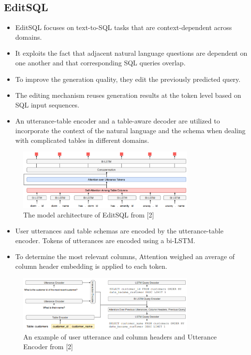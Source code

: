 \subsection*{EditSQL}

\begin{itemize}
    \item EditSQL focuses on text-to-SQL tasks that are context-dependent across domains.
    \item It exploits the fact that adjacent natural language questions are dependent on one another and that corresponding SQL queries overlap.
    \item To improve the generation quality, they edit the previously predicted query.
    \item The editing mechanism reuses generation results at the token level based on SQL input sequences.
    \item An utterance-table encoder and a table-aware decoder are utilized to incorporate the context of the natural language and the schema when dealing with complicated tables in different domains.
\end{itemize}

\begin{figure}[htb]
    \centering
    \includegraphics[width=0.8\textwidth]{pics/EditSQL/Table.png}
    \caption{The model architecture of EditSQL from [2]}
    \label{fig:EditSQL}
\end{figure}


\begin{itemize}
    \item User utterances and table schemas are encoded by the utterance-table encoder. Tokens of utterances are encoded using a bi-LSTM.
    \item To determine the most relevant columns, Attention weighed an average of column header embedding is applied to each token.
\end{itemize}

\begin{figure}[htb]
    \centering
    \includegraphics[width=0.8\textwidth]{pics/EditSQL/model.png}
    \caption{An example of user utterance and column headers and Utterance Encoder from [2]}
    \label{fig:EditSQL_model}
\end{figure}

